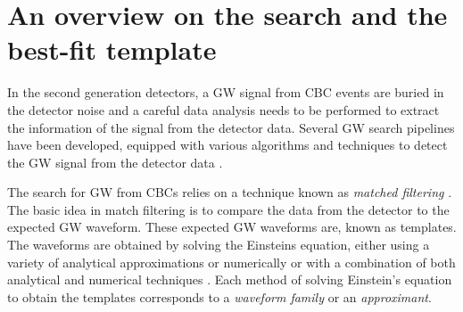 

\section{An overview on the search and the best-fit template }

In the second generation detectors, a GW signal from CBC events are buried in the detector noise and a careful data analysis needs to be performed to extract the information of the signal from the detector data. Several GW search pipelines have been developed, equipped with various algorithms and techniques to detect the GW signal from the detector data \cite{burstpipeline, GSTLAL1,GSTLAL2,Canton:2014ena,Usman:2015kfa,Nitz:2017svb}.  


The search for GW from CBCs relies on a  technique known as \textit{matched filtering} \cite{SchutzBF, JCreightonBook}. The basic idea in match filtering is to compare the data from the detector to the expected GW waveform. These expected GW waveforms are, known as templates. The waveforms are obtained by solving the Einsteins equation, either using a variety of analytical approximations or numerically or with a combination of both analytical and numerical techniques \cite{BH-GW-NR}.  Each method of solving Einstein's equation to obtain the templates corresponds to a \textit{waveform family} or an \textit{approximant}.



